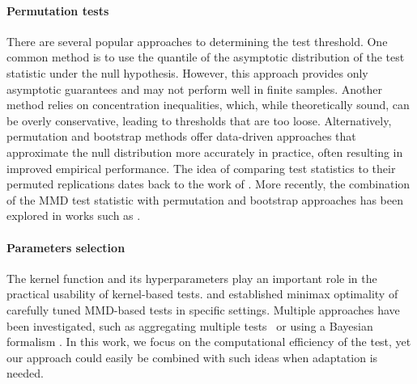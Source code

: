 
\paragraph{Permutation tests}
There are several popular approaches to determining the test threshold. One common method is to use the quantile of the asymptotic distribution of the test statistic under the null hypothesis. However, this approach provides only asymptotic guarantees and may not perform well in finite samples. Another method relies on concentration inequalities, which, while theoretically sound, can be overly conservative, leading to thresholds that are too loose. Alternatively, permutation and bootstrap methods offer data-driven approaches that approximate the null distribution more accurately in practice, often resulting in improved empirical performance. The idea of comparing test statistics to their permuted replications dates back to the work of . More recently, the combination of the MMD test statistic with permutation and bootstrap approaches has been explored in works such as .

\paragraph{Parameters selection} 
The kernel function and its hyperparameters play an important role in the practical usability of kernel-based tests. 
 and  established minimax optimality of carefully tuned MMD-based tests in specific settings.
Multiple approaches have been investigated, such as aggregating multiple tests~ or using a Bayesian formalism .
In this work, we focus on the computational efficiency of the test, yet our approach could easily be combined with such ideas when adaptation is needed.


%